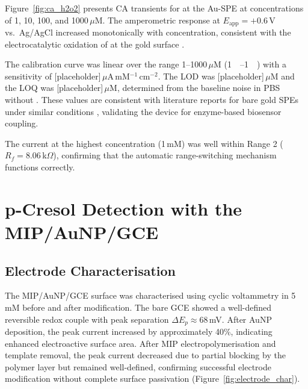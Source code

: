 Figure~\ref{fig:ca_h2o2} presents CA transients for  at the Au-SPE at concentrations of 1, 10, 100, and 1000\,$\mu$M. The amperometric response at $E_\text{app} = +0.6$\,V vs.\ Ag/AgCl increased monotonically with concentration, consistent with the electrocatalytic oxidation of  at the gold surface \cite{Fanjul-Bolado2008}.


The calibration curve was linear over the range 1--1000\,$\mu$M (\SI{1}{\micro\molar}--\SI{1}{\milli\molar}) with a sensitivity of [placeholder]\,$\mu$A\,mM$^{-1}$\,cm$^{-2}$. The LOD was [placeholder]\,$\mu$M and the LOQ was [placeholder]\,$\mu$M, determined from the baseline noise in PBS without . These values are consistent with literature reports for bare gold SPEs under similar conditions \cite{Fanjul-Bolado2008, Wang2006}, validating the device for enzyme-based biosensor coupling.

The current at the highest concentration (1\,mM) was well within Range 2 ($R_f = 8.06$\,k$\Omega$), confirming that the automatic range-switching mechanism functions correctly.

\section{p-Cresol Detection with the MIP/AuNP/GCE}
\label{sec:pcresol_results}

\subsection{Electrode Characterisation}

The MIP/AuNP/GCE surface was characterised using cyclic voltammetry in 5\,mM \ferrocene{} before and after modification. The bare GCE showed a well-defined reversible redox couple with peak separation $\Delta E_p \approx 68$\,mV. After AuNP deposition, the peak current increased by approximately 40\%, indicating enhanced electroactive surface area. After MIP electropolymerisation and template removal, the peak current decreased due to partial blocking by the polymer layer but remained well-defined, confirming successful electrode modification without complete surface passivation (Figure~\ref{fig:electrode_char}).

